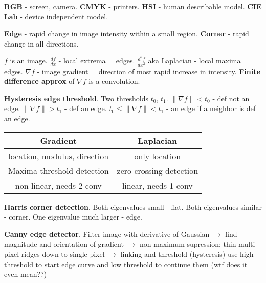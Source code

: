 \documentclass[twocolumn]{zett}
\begin{document}
\begin{node}
  \textbf{RGB} - screen, camera.
  \textbf{CMYK} - printers.
  \textbf{HSI} - human describable model.
  \textbf{CIE Lab} - device independent model.
\end{node}

\begin{node}
  \textbf{Edge} - rapid change in image intensity within a small region.
  \textbf{Corner} - rapid change in all directions.
\end{node}

\begin{node}
  $f$ is an image.
  $\frac{df}{dx}$ - local extrema = edges.
  $\frac{d^{2}f}{dx^{2}}$ aka Laplacian - local maxima = edges.
  $\nabla f$ - image gradient = direction of most rapid increase in intensity.
  \textbf{Finite difference approx} of $\nabla f$ is a convolution.
\end{node}

\begin{node}
  \textbf{Hysteresis edge threshold}.
  Two thresholds $t_{0}$, $t_{1}$.
  $\lVert \nabla f \rVert < t_{0}$ - def not an edge.
  $\lVert \nabla f \rVert > t_{1}$ - def an edge.
  $t_{0} \leq \lVert \nabla f \rVert < t_{1}$ - an edge if a neighbor is def an edge.
\end{node}

\begin{node}
  \begin{tabular}{cc}
    Gradient & Laplacian\\\hline
    location, modulus, direction & only location\\\hline
    Maxima threshold detection & zero-crossing detection\\\hline
    non-linear, needs 2 conv & linear, needs 1 conv
  \end{tabular}
\end{node}

\begin{node}
  \textbf{Harris corner detection}.
  Both eigenvalues small - flat.
  Both eigenvalues similar - corner.
  One eigenvalue much larger - edge.
\end{node}

\begin{node}
  \textbf{Canny edge detector}.
  Filter image with derivative of Gaussian $\to$ find magnitude and orientation of gradient $\to$ non maximum supression: thin multi pixel ridges down to single pixel $\to$ linking and threshold (hysteresis) use high threshold to start edge curve and low threshold to continue them (wtf does it even mean??)
\end{node}
\end{document}
